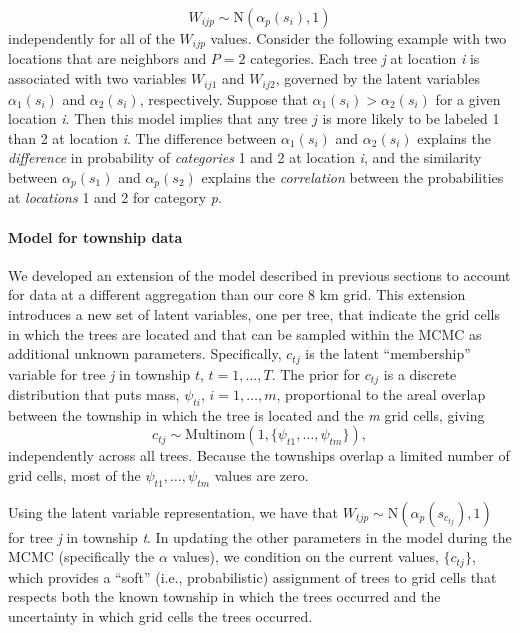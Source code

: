 \documentclass[10pt,letterpaper]{article}
\begin{document}
\noindent 
\[
W_{ijp}\sim\mbox{N}(\alpha_{p}(s_{i}),1)
\]
independently for all of the $W_{ijp}$ values. Consider the following
example with two locations that are neighbors and $P=2$ categories.
Each tree \emph{j} at location \emph{i} is associated with two variables $W_{ij1}$
and $W_{ij2}$, governed by the latent variables $\alpha_{1}(s_{i})$
and $\alpha_{2}(s_{i})$, respectively. Suppose that $\alpha_{1}(s_{i})>\alpha_{2}(s_{i})$
for a given location \emph{i}. Then this model implies that any tree $j$
is more likely to be labeled 1 than 2 at location \emph{i}. The difference
between $\alpha_{1}(s_{i})$ and $\alpha_{2}(s_{i})$ explains the
\textit{difference} in probability of \textit{categories} 1 and 2
at location \emph{i}, and the similarity between $\alpha_{p}(s_{1})$
and $\alpha_{p}(s_{2})$ explains the \textit{correlation} between
the probabilities at \textit{locations} 1 and 2 for category \emph{p}.




\paragraph*{Model for township data}
\label{sub:Model-for-township}

\linenumbers

We developed an extension of the model described in previous sections
to account for data at a different aggregation than our core 8 km
grid. This extension introduces a new set of latent variables, one
per tree, that indicate the grid cells in which the trees are located
and that can be sampled within the MCMC as additional unknown parameters.
Specifically, $c_{tj}$ is the latent ``membership'' variable for
tree \emph{j} in township $t$, $t=1,\ldots,T$. The prior for $c_{tj}$
is a discrete distribution that puts mass, $\psi_{ti}$, $i=1,\ldots,m$,
proportional to the areal overlap between the township in which the
tree is located and the \emph{m} grid cells, giving 
\[
c_{tj}\sim\mbox{Multinom}(1,\{\psi_{t1},\ldots,\psi_{tm}\}),
\]
independently across all trees. Because the townships overlap a limited
number of grid cells, most of the $\psi_{t1},\ldots,\psi_{tm}$ values
are zero.

Using the latent variable representation, we have that $W_{tjp}\sim\mbox{N}(\alpha_{p}(s_{c_{tj}}),1)$
for tree \emph{j} in township \emph{t}. In updating the other parameters in
the model during the MCMC (specifically the $\alpha$ values), we
condition on the current values, $\{c_{tj}\}$, which provides a ``soft''
(i.e., probabilistic) assignment of trees to grid cells that respects
both the known township in which the trees occurred and the uncertainty
in which grid cells the trees occurred.
\end{document}
